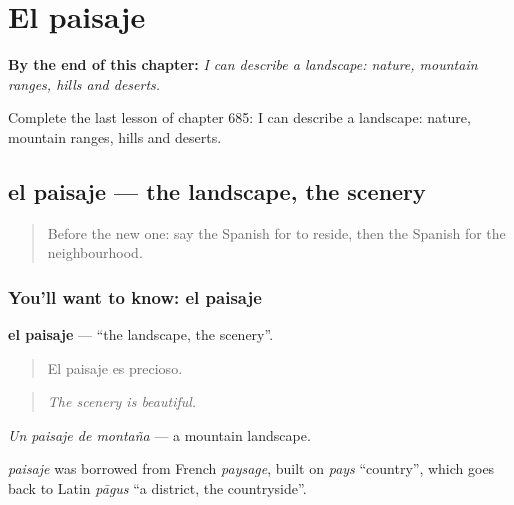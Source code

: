 
\chapter{El paisaje}
\label{ch:es-el-paisaje}

\begin{chapteropening}
\textbf{By the end of this chapter:} \emph{I can describe a landscape: nature, mountain ranges, hills and deserts.}

Complete the last lesson of chapter 685: I can describe a landscape: nature, mountain ranges, hills and deserts.
\end{chapteropening}

\section[el paisaje]{el paisaje — the landscape, the scenery}

\label{lesson:ES-C685-paisaje}



\begin{quote}
Before the new one: say the Spanish for to reside, then the Spanish for the neighbourhood.
\end{quote}

\subsection*{You'll want to know: el paisaje}
\textbf{el paisaje} — \textquotedblleft{}the landscape, the scenery\textquotedblright{}.

\begin{quote}
El paisaje es precioso.
\end{quote}

\begin{quote}
\emph{The scenery is beautiful.}
\end{quote}

\emph{Un paisaje de montaña} — a mountain landscape.

\begin{cousinweb}
\emph{paisaje} was borrowed from French \emph{paysage}, built on \emph{pays} \textquotedblleft{}country\textquotedblright{}, which goes back to Latin \emph{pāgus} \textquotedblleft{}a district, the countryside\textquotedblright{}.
\end{cousinweb}

